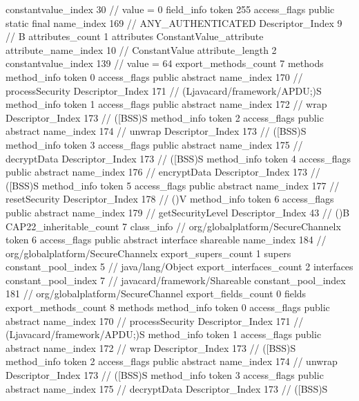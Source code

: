 {{{{{{{					constantvalue_index	30		// value = 0
				}
				}
			}
			field_info {
				token	255
				access_flags	public static final
				name_index	169		// ANY_AUTHENTICATED
				Descriptor_Index	9		// B
				attributes_count	1
				attributes {
				ConstantValue_attribute {
					attribute_name_index	10		// ConstantValue
					attribute_length	2
					constantvalue_index	139		// value = 64
				}
				}
			}
			}
			export_methods_count	7
			methods {
				method_info {
					token	0
					access_flags	public abstract
					name_index	170		// processSecurity
					Descriptor_Index	171		// (Ljavacard/framework/APDU;)S
				}
				method_info {
					token	1
					access_flags	public abstract
					name_index	172		// wrap
					Descriptor_Index	173		// ([BSS)S
				}
				method_info {
					token	2
					access_flags	public abstract
					name_index	174		// unwrap
					Descriptor_Index	173		// ([BSS)S
				}
				method_info {
					token	3
					access_flags	public abstract
					name_index	175		// decryptData
					Descriptor_Index	173		// ([BSS)S
				}
				method_info {
					token	4
					access_flags	public abstract
					name_index	176		// encryptData
					Descriptor_Index	173		// ([BSS)S
				}
				method_info {
					token	5
					access_flags	public abstract
					name_index	177		// resetSecurity
					Descriptor_Index	178		// ()V
				}
				method_info {
					token	6
					access_flags	public abstract
					name_index	179		// getSecurityLevel
					Descriptor_Index	43		// ()B
				}
			}
			CAP22_inheritable_count	7
		}
		class_info {		// org/globalplatform/SecureChannelx
			token	6
			access_flags	public abstract interface shareable
			name_index	184		// org/globalplatform/SecureChannelx
			export_supers_count	1
			supers {
				constant_pool_index	5		// java/lang/Object
			}
			export_interfaces_count	2
			interfaces {
				constant_pool_index	7		// javacard/framework/Shareable
				constant_pool_index	181		// org/globalplatform/SecureChannel
			}
			export_fields_count	0
			fields {
			}
			export_methods_count	8
			methods {
				method_info {
					token	0
					access_flags	public abstract
					name_index	170		// processSecurity
					Descriptor_Index	171		// (Ljavacard/framework/APDU;)S
				}
				method_info {
					token	1
					access_flags	public abstract
					name_index	172		// wrap
					Descriptor_Index	173		// ([BSS)S
				}
				method_info {
					token	2
					access_flags	public abstract
					name_index	174		// unwrap
					Descriptor_Index	173		// ([BSS)S
				}
				method_info {
					token	3
					access_flags	public abstract
					name_index	175		// decryptData
					Descriptor_Index	173		// ([BSS)S
}}}}}
